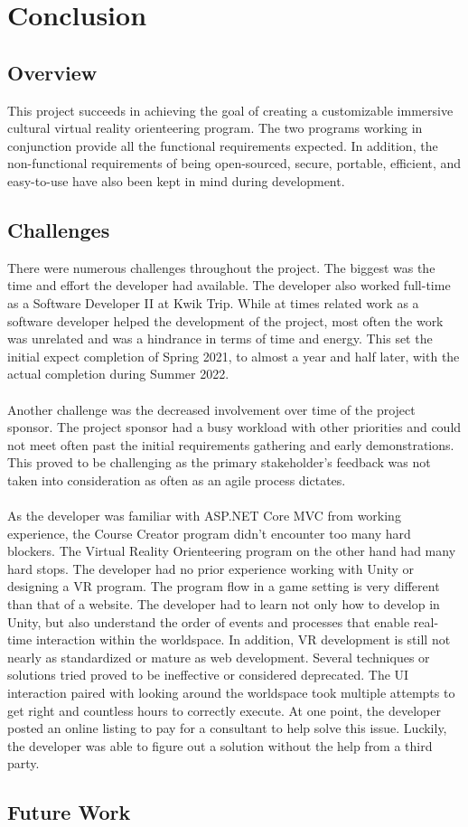 \section{Conclusion}																	
\label{sec:Conclusion}

\subsection{Overview} 
This project succeeds in achieving the goal of creating a customizable immersive cultural virtual reality orienteering program. The two programs working in conjunction provide all the functional requirements expected. In addition, the non-functional requirements of being open-sourced, secure, portable, efficient, and easy-to-use have also been kept in mind during development.

\subsection{Challenges}
There were numerous challenges throughout the project. The biggest was the time and effort the developer had available. The developer also worked full-time as a Software Developer II at Kwik Trip. While at times related work as a software developer helped the development of the project, most often the work was unrelated and was a hindrance in terms of time and energy. This set the initial expect completion of Spring 2021, to almost a year and half later, with the actual completion during Summer 2022. \\
\\
Another challenge was the decreased involvement over time of the project sponsor. The project sponsor had a busy workload with other priorities and could not meet often past the initial requirements gathering and early demonstrations. This proved to be challenging as the primary stakeholder's feedback was not taken into consideration as often as an agile process dictates.\\
\\ 
As the developer was familiar with ASP.NET Core MVC from working experience, the Course Creator program didn't encounter too many hard blockers. The Virtual Reality Orienteering program on the other hand had many hard stops. The developer had no prior experience working with Unity or designing a VR program. The program flow in a game setting is very different than that of a website. The developer had to learn not only how to develop in Unity, but also understand the order of events and processes that enable real-time interaction within the worldspace. In addition, VR development is still not nearly as standardized or mature as web development. Several techniques or solutions tried proved to be ineffective or considered deprecated.   The UI interaction paired with looking around the worldspace took multiple attempts to get right and countless hours to correctly execute. At one point, the developer posted an online listing to pay for a consultant to help solve this issue. Luckily, the developer was able to figure out a solution without the help from a third party. 

\subsection{Future Work}
